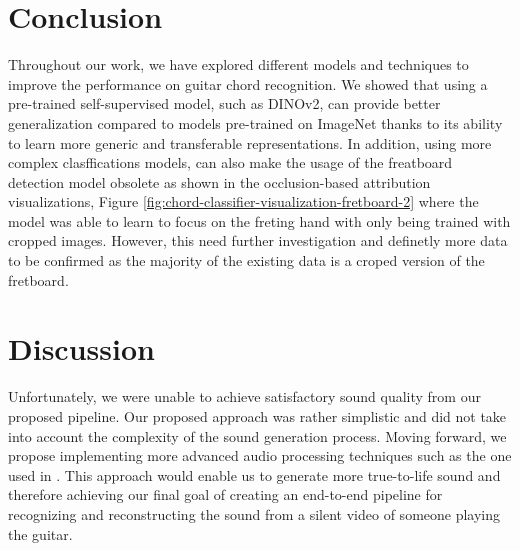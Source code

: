 \documentclass[10pt,twocolumn,letterpaper]{article}
\begin{document}
\section{Conclusion}
Throughout our work, we have explored different models and techniques to improve the performance on guitar chord recognition.  We showed that using a pre-trained self-supervised model, such as DINOv2, can provide better generalization compared to models pre-trained on ImageNet thanks to its ability to learn more generic and transferable representations. In addition, using more complex clasffications models, can also make the usage of the freatboard detection model obsolete as shown in the occlusion-based attribution visualizations, Figure \ref{fig:chord-classifier-visualization-fretboard-2} where the model was able to learn to focus on the freting hand with only being trained with cropped images. However, this need further investigation and definetly more data to be confirmed as the majority of the existing data is a croped version of the fretboard.

\section{Discussion}
Unfortunately, we were unable to achieve satisfactory sound quality from our proposed pipeline. Our proposed approach was rather simplistic and did not take into account the complexity of the sound generation process. Moving forward, we propose implementing more advanced audio processing techniques such as the one used in \cite{su2020audeo}. This approach would enable us to generate more true-to-life sound and therefore achieving our final goal of creating an end-to-end pipeline for recognizing and reconstructing the sound from a silent video of someone playing the guitar.

    {\small
        
        
    }
\end{document}
